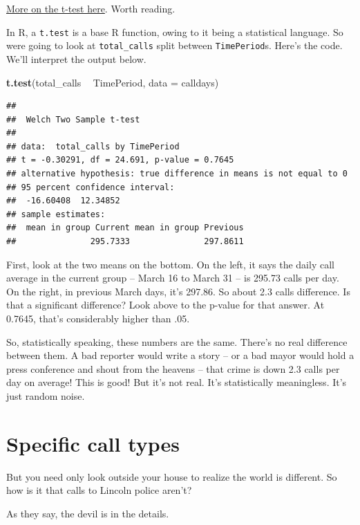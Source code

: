 \documentclass[]{book}
\newenvironment{Shaded}{\begin{snugshade}}{\end{snugshade}}
\newcommand{\DataTypeTok}[1]{\textcolor[rgb]{0.13,0.29,0.53}{#1}}
\newcommand{\KeywordTok}[1]{\textcolor[rgb]{0.13,0.29,0.53}{\textbf{#1}}}
\newcommand{\NormalTok}[1]{#1}
\newcommand{\OperatorTok}[1]{\textcolor[rgb]{0.81,0.36,0.00}{\textbf{#1}}}
\newcommand{\StringTok}[1]{\textcolor[rgb]{0.31,0.60,0.02}{#1}}
\begin{document}
\href{https://conjointly.com/kb/statistical-student-t-test/}{More on the t-test here}. Worth reading.

In R, a \texttt{t.test} is a base R function, owing to it being a statistical language. So were going to look at \texttt{total\_calls} split between \texttt{TimePeriod}s. Here's the code. We'll interpret the output below.

\begin{Shaded}
\begin{Highlighting}[]
\KeywordTok{t.test}\NormalTok{(total_calls }\OperatorTok{~}\StringTok{ }\NormalTok{TimePeriod, }\DataTypeTok{data =}\NormalTok{ calldays)}
\end{Highlighting}
\end{Shaded}

\begin{verbatim}
## 
##  Welch Two Sample t-test
## 
## data:  total_calls by TimePeriod
## t = -0.30291, df = 24.691, p-value = 0.7645
## alternative hypothesis: true difference in means is not equal to 0
## 95 percent confidence interval:
##  -16.60408  12.34852
## sample estimates:
##  mean in group Current mean in group Previous 
##               295.7333               297.8611
\end{verbatim}

First, look at the two means on the bottom. On the left, it says the daily call average in the current group -- March 16 to March 31 -- is 295.73 calls per day. On the right, in previous March days, it's 297.86. So about 2.3 calls difference. Is that a significant difference? Look above to the p-value for that answer. At 0.7645, that's considerably higher than .05.

So, statistically speaking, these numbers are the same. There's no real difference between them. A bad reporter would write a story -- or a bad mayor would hold a press conference and shout from the heavens -- that crime is down 2.3 calls per day on average! This is good! But it's not real. It's statistically meaningless. It's just random noise.

\hypertarget{specific-call-types}{%
\section{Specific call types}\label{specific-call-types}}

But you need only look outside your house to realize the world is different. So how is it that calls to Lincoln police aren't?

As they say, the devil is in the details.
\end{document}
